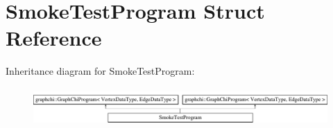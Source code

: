 \hypertarget{struct_smoke_test_program}{\section{Smoke\-Test\-Program Struct Reference}
\label{struct_smoke_test_program}
}
Inheritance diagram for Smoke\-Test\-Program\-:\begin{figure}[H]
\begin{center}
\leavevmode
\includegraphics[height=1.454545cm]{struct_smoke_test_program}
\end{center}
\end{figure}
